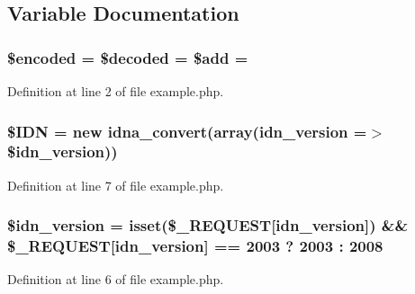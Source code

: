 \subsection{Variable Documentation}
\subsubsection[{\texorpdfstring{\$encoded}{$encoded}}]{\setlength{\rightskip}{0pt plus 5cm}\$encoded = \$decoded = \${\bf add} = \textquotesingle{}\textquotesingle{}}\hypertarget{example_8php_af709b460501204e2ec7e34e96e7de576}{}\label{example_8php_af709b460501204e2ec7e34e96e7de576}


Definition at line 2 of file example.\+php.

\subsubsection[{\texorpdfstring{\$\+I\+DN}{$IDN}}]{\setlength{\rightskip}{0pt plus 5cm}\$I\+DN = new {\bf idna\+\_\+convert}(array(\textquotesingle{}idn\+\_\+version\textquotesingle{} =$>$ \$idn\+\_\+version))}\hypertarget{example_8php_aa45ac61e5ada434ea385befcd1aea16d}{}\label{example_8php_aa45ac61e5ada434ea385befcd1aea16d}


Definition at line 7 of file example.\+php.

\subsubsection[{\texorpdfstring{\$idn\+\_\+version}{$idn_version}}]{\setlength{\rightskip}{0pt plus 5cm}\$idn\+\_\+version = isset(\$\+\_\+\+R\+E\+Q\+U\+E\+ST\mbox{[}\textquotesingle{}idn\+\_\+version\textquotesingle{}\mbox{]}) \&\& \$\+\_\+\+R\+E\+Q\+U\+E\+ST\mbox{[}\textquotesingle{}idn\+\_\+version\textquotesingle{}\mbox{]} == 2003 ? 2003 \+: 2008}\hypertarget{example_8php_aaa64132973e10962c52265cfbee1cb9c}{}\label{example_8php_aaa64132973e10962c52265cfbee1cb9c}


Definition at line 6 of file example.\+php.

